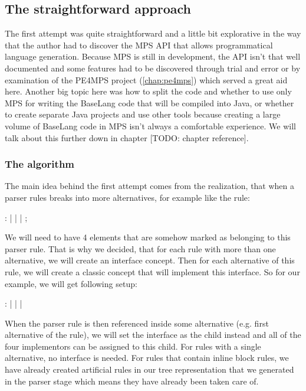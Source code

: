 
\subsection{The straightforward approach}

The first attempt was quite straightforward and a little bit explorative in the way that the author had to discover the MPS API that allows programmatical language generation. Because MPS is still in development, the API isn't that well documented and some features had to be discovered through trial and error or by examination of the PE4MPS project (\ref{chap:pe4mps}) which served a great aid here. Another big topic here was how to split the code and whether to use only MPS for writing the BaseLang code that will be compiled into Java, or whether to create separate Java projects and use other tools because creating a large volume of BaseLang code in MPS isn't always a comfortable experience. We will talk about this further down in chapter [TODO: chapter reference].

\subsubsection{The algorithm}
The main idea behind the first attempt comes from the realization, that when a parser rules breaks into more alternatives, for example like the  rule:

\begin{antlr}
	    :   
           |   
           |   
           |   
           ;
\end{antlr}  

We will need to have 4 elements that are somehow marked as belonging to this parser rule. That is why we decided, that for each rule with more than one alternative, we will create an interface concept. Then for each alternative of this rule, we will create a classic concept that will implement this interface. So for our  example, we will get following setup:

\begin{antlr}
	   :   
           |   
           |   
           |   
\end{antlr}

When the  parser rule is then referenced inside some alternative (e.g. first alternative of the  rule), we will set the  interface as the child instead and all of the four implementors can be assigned to this child. For rules with a single alternative, no interface is needed. For rules that contain inline block rules, we have already created artificial rules in our tree representation that we generated in the parser stage which means they have already been taken care of.


